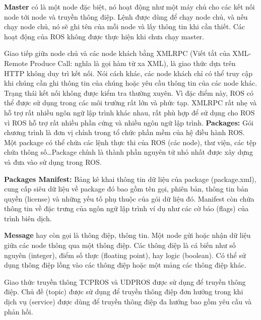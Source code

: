 \textbf{Master} có là một node đặc biệt, nó hoạt động như một máy chủ cho các kết nối node tới node và truyền thông điệp. Lệnh  được dùng để chạy node chủ, và nếu chạy node chủ, nó sẽ ghi tên của mỗi node và lấy thông tin khi cần thiết. Các hoạt động của ROS không được thực hiện khi chưa chạy master. 

Giao tiếp giữa node chủ và các node khách bằng XMLRPC (Viết tắt của XML-Remote Produce Call: nghĩa là gọi hàm từ xa XML), là giao thức dựa trên HTTP không duy trì kết nối. Nói cách khác, các node khách chỉ có thể truy cập khi chúng cần ghi thông tin của chúng hoặc yêu cầu thông tin của các node khác. Trạng thái kết nối không được kiểm tra thường xuyên. Vì đặc điểm này, ROS có thể được sử dụng trong các môi trường rất lớn và phức tạp. XMLRPC rất nhẹ và hỗ trợ rất nhiều ngôn ngữ lập trình khác nhau, rất phù hợp để sử dụng cho ROS vì ROS hỗ trợ rất nhiều phần cứng và nhiều ngôn ngữ lập trình.   
\textbf{Packages:} Gói chương trình là đơn vị chính trong tổ chức phần mềm của hệ điều hành ROS. Một package có thể chứa các lệnh thực thi của ROS (các node), thư viện, các tệp chứa thông số\dots Package chính là thành phần nguyên tử nhỏ nhất được xây dựng và đưa vào sử dụng trong ROS.

\textbf{Packages Manifest:} Bảng kê khai thông tin dữ liệu của package (package.xml), cung cấp siêu dữ liệu về package đó bao gồm tên gọi, phiên bản, thông tin bản quyền (license) và những yếu tố phụ thuộc của gói dữ liệu đó. Manifest còn chứa thông tin về đặc trưng của ngôn ngữ lập trình ví dụ như các cờ báo (flags) của trình biên dịch. 

\textbf{Message} hay còn gọi là thông điệp, thông tin. Một node gửi hoặc nhận dữ liệu giữa các node thông qua một thông điệp. Các thông điệp là cá biến như số nguyên (integer), điểm số thực (floating point), hay logic (boolean). Có thể sử dụng thông điệp lồng vào các thông điệp hoặc một mảng các thông điệp khác. 

Giao thức truyền thông TCPROS và UDPROS được sử dụng để truyền thông điệp. Chủ đề (topic) được sử dụng để truyền thông điệp đơn hướng trong khi dịch vụ (service) được dùng để truyền thông điệp đa hướng bao gồm yêu cầu và phản hồi.

